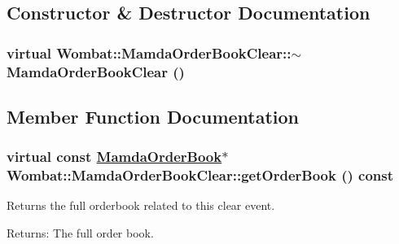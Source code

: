 \subsection{Constructor \& Destructor Documentation}
\hypertarget{classWombat_1_1MamdaOrderBookClear_39182ff875e6cc643c31948cf5a97f31}{
\subsubsection[$\sim$MamdaOrderBookClear]{\setlength{\rightskip}{0pt plus 5cm}virtual Wombat::Mamda\-Order\-Book\-Clear::$\sim$Mamda\-Order\-Book\-Clear ()}}
\label{classWombat_1_1MamdaOrderBookClear_39182ff875e6cc643c31948cf5a97f31}




\subsection{Member Function Documentation}
\hypertarget{classWombat_1_1MamdaOrderBookClear_af2cd011b83b28f26b4d9e8a7e184952}{
\subsubsection[getOrderBook]{\setlength{\rightskip}{0pt plus 5cm}virtual const \hyperlink{classWombat_1_1MamdaOrderBook}{Mamda\-Order\-Book}$\ast$ Wombat::Mamda\-Order\-Book\-Clear::get\-Order\-Book () const}}
\label{classWombat_1_1MamdaOrderBookClear_af2cd011b83b28f26b4d9e8a7e184952}


Returns the full orderbook related to this clear event. 

\begin{Desc}
\item[Returns:]The full order book. \end{Desc}
